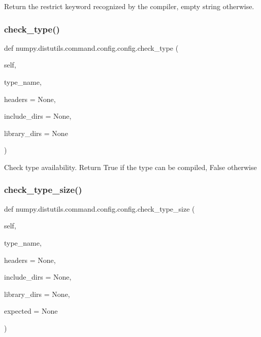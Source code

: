 \begin{DoxyVerb}Return the restrict keyword recognized by the compiler, empty string
otherwise.\end{DoxyVerb}
 \mbox{\label{classnumpy_1_1distutils_1_1command_1_1config_1_1config_a700ab11b852a3cbc250a3c7110bb6710}} 
\subsubsection{\texorpdfstring{check\+\_\+type()}{check\_type()}}
{\footnotesize\ttfamily def numpy.\+distutils.\+command.\+config.\+config.\+check\+\_\+type (\begin{DoxyParamCaption}\item[{}]{self,  }\item[{}]{type\+\_\+name,  }\item[{}]{headers = {\ttfamily None},  }\item[{}]{include\+\_\+dirs = {\ttfamily None},  }\item[{}]{library\+\_\+dirs = {\ttfamily None} }\end{DoxyParamCaption})}

\begin{DoxyVerb}Check type availability. Return True if the type can be compiled,
False otherwise\end{DoxyVerb}
 \mbox{\label{classnumpy_1_1distutils_1_1command_1_1config_1_1config_aedbe4f109a0c23f5bb1516120b680158}} 
\subsubsection{\texorpdfstring{check\+\_\+type\+\_\+size()}{check\_type\_size()}}
{\footnotesize\ttfamily def numpy.\+distutils.\+command.\+config.\+config.\+check\+\_\+type\+\_\+size (\begin{DoxyParamCaption}\item[{}]{self,  }\item[{}]{type\+\_\+name,  }\item[{}]{headers = {\ttfamily None},  }\item[{}]{include\+\_\+dirs = {\ttfamily None},  }\item[{}]{library\+\_\+dirs = {\ttfamily None},  }\item[{}]{expected = {\ttfamily None} }\end{DoxyParamCaption})}


